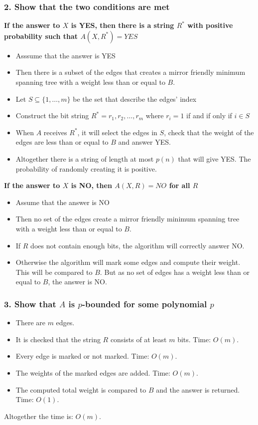 \documentclass[12pt]{article}
\begin{document}
\subsubsection*{2. Show that the two conditions are met}
\textbf{If the answer to $X$ is YES, then there is a string $R^*$ with positive probability such that $A(X, R^*) = YES$}
\begin{itemize}
\item[] Asssume that the answer is YES
\item[] Then there is a subset of the edges that creates a mirror friendly minimum spanning tree with a weight less than or equal to $B$.
\item[] Let $S \subseteq \{1,\dots,m\}$ be the set that describe the edges' index
\item[] Construct the bit string $R^* = r_1,r_2,\dots,r_m$ where $r_i = 1$ if and if only if $i \in S$
\item[] When $A$ receives $R^*$, it will select the edges in $S$, check that the weight of the edges are less than or equal to $B$ and answer YES.
\item[] Altogether there is a string of length at most $p(n)$ that will give YES. The probability of randomly creating it is positive.
\end{itemize}
\textbf{If the answer to $X$ is NO, then $A(X, R) = NO$ for all $R$}
\begin{itemize}
\item[] Assume that the answer is NO
\item[] Then no set of the edges create a mirror friendly minimum spanning tree with a weight less than or equal to $B$.
\item[] If $R$ does not contain enough bits, the algorithm will correctly answer NO.
\item[] Otherwise the algorithm will mark some edges and compute their weight. This will be compared to $B$. But as no set of edges has a weight less than or equal to $B$, the answer is NO.
\end{itemize}
\subsubsection*{3. Show that $A$ is $p$-bounded for some polynomial $p$}
\begin{itemize}
\item[] There are $m$ edges.
\item[] It is checked that the string $R$ consists of at least $m$ bits. Time: $O(m)$.
\item[] Every edge is marked or not marked. Time: $O(m)$.
\item[] The weights of the marked edges are added. Time: $O(m)$.
\item[] The computed total weight is compared to $B$ and the answer is returned. Time: $O(1)$.
\end{itemize}
Altogether the time is: $O(m)$.
\end{document}
